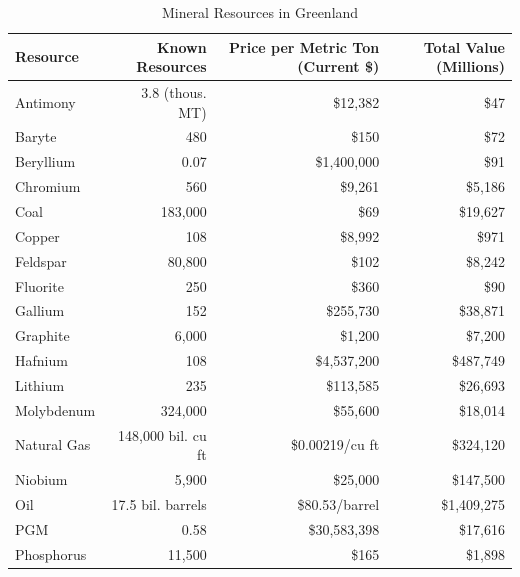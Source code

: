 \documentclass{adonis}
\begin{document}
    \renewcommand{\arraystretch}{0.95}
\begin{table}[H]
\centering
\small
\begin{threeparttable}
\caption{Mineral Resources in Greenland \citep{usgs2024mcs, rosa2023mima}}
\label{fig:greenland-resources}
\begin{tabular}{@{}l@{\hskip 6pt}r@{\hskip 6pt}r@{\hskip 6pt}r@{}}
\toprule
\textbf{Resource} & \textbf{Known Resources} & \textbf{Price per Metric Ton (Current \$)} & \textbf{Total Value (Millions)} \\
\midrule
Antimony           & 3.8 (thous. MT)        & \$12,382         & \$47 \\
Baryte             & 480                    & \$150            & \$72 \\
Beryllium          & 0.07                   & \$1,400,000      & \$91 \\
Chromium           & 560                    & \$9,261          & \$5,186 \\
Coal               & 183,000                & \$69             & \$19,627 \\
Copper             & 108                    & \$8,992          & \$971 \\
Feldspar           & 80,800                 & \$102            & \$8,242 \\
Fluorite           & 250                    & \$360            & \$90 \\
Gallium            & 152                    & \$255,730        & \$38,871 \\
Graphite           & 6,000                  & \$1,200          & \$7,200 \\
Hafnium            & 108                    & \$4,537,200      & \$487,749 \\
Lithium            & 235                    & \$113,585        & \$26,693 \\
Molybdenum         & 324,000                & \$55,600         & \$18,014 \\
Natural Gas        & 148,000 bil. cu ft     & \$0.00219/cu ft  & \$324,120 \\
Niobium            & 5,900                  & \$25,000         & \$147,500 \\
Oil                & 17.5 bil. barrels      & \$80.53/barrel   & \$1,409,275 \\
PGM\tnote{*}       & 0.58                   & \$30,583,398     & \$17,616 \\
Phosphorus         & 11,500                 & \$165            & \$1,898 \\

\end{tabular}
\end{threeparttable}
\end{table}
\end{document}
